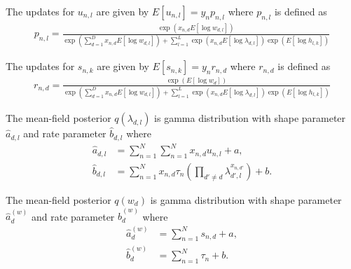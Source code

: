 \documentclass[12pt]{amsart}
\begin{document}
The updates for $u_{n,l}$ are given by $E[u_{n,l}] = y_{n} p_{n,l}$ where $p_{n,l}$ is defined as 
\begin{align}
{p}_{n,l} =\frac{\exp( x_{n,d} E[\log w_{d,l}] )}{ \exp(\sum_{d=1}^{D}x_{n,d} E[\log w_{d,l}] )+  \sum_{l=1}^{L} \exp( x_{n,d} E[\log \lambda_{d,l}] )\exp( E[\log h_{l,k}] ) } 
\end{align}

The updates for $s_{n,k}$ are given by $E[s_{n,k}] = y_{n} r_{n,d}$ where $r_{n,d}$ is defined as 
\begin{align}
r_{n,d} =\frac{\exp(E[\log{w_d}])}{ \exp(\sum_{d=1}^{D}x_{n,d} E[\log w_{d,l}] )+  \sum_{l=1}^{L} \exp( x_{n,d} E[\log \lambda_{d,l}] )\exp( E[\log h_{l,k}] ) } 
\end{align}

The mean-field posterior $q(\lambda_{d,l})$ is gamma distribution with shape parameter $\hat a_{d,l}$ and rate parameter $\hat b_{d,l}$ where
\begin{align}
\hat a_{d, l} &= \sum_{n=1}^{N} \sum_{n=1}^{N}x_{n,d} u_{n,l} + a, \\
\hat b_{d, l} &= \sum_{n=1}^{N} x_{n,d} \tau_n \left( \prod_{d'\neq d} \lambda_{d',l}^{x_{n,d'}} \right) + b.
\end{align}

The mean-field posterior $q(w_{d})$ is gamma distribution with shape parameter $\hat a_{d}^{(w)}$ and rate parameter $\hat b_{d}^{(w)}$ where
\begin{align}
\hat a_{d}^{(w)} &= \sum_{n=1}^{N}  s_{n,d} + a, \\
\hat b_{d}^{(w)} &= \sum_{n=1}^{N} \tau_n + b.
\end{align}
\end{document}
